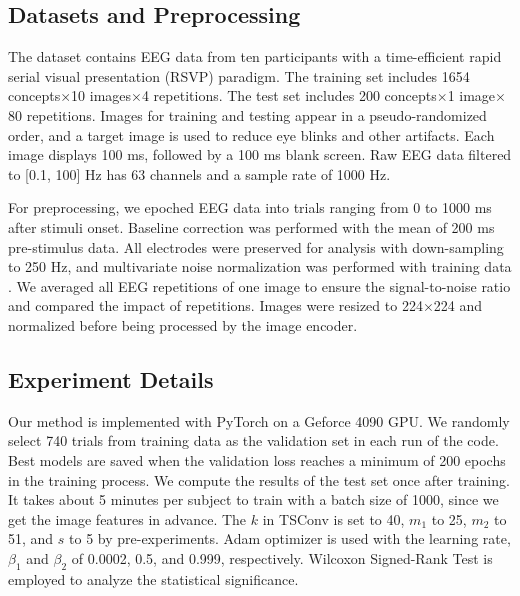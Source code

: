 \label{sec:results}
\subsection{Datasets and Preprocessing}
The dataset \citep{gifford2022large} contains EEG data from ten participants with a time-efficient rapid serial visual presentation (RSVP) paradigm.
The training set includes 1654 concepts\(\times\)10 images\(\times\)4 repetitions.
The test set includes 200 concepts\(\times\)1 image\(\times\)80 repetitions.
Images for training and testing appear in a pseudo-randomized order, and a target image is used to reduce eye blinks and other artifacts.
Each image displays 100 ms, followed by a 100 ms blank screen.
Raw EEG data filtered to [0.1, 100] Hz has 63 channels and a sample rate of 1000 Hz.

For preprocessing, we epoched EEG data into trials ranging from 0 to 1000 ms after stimuli onset.
Baseline correction was performed with the mean of 200 ms pre-stimulus data. 
All electrodes were preserved for analysis with down-sampling to 250 Hz, and multivariate noise normalization was performed with training data \citep{guggenmos2018multivariate}.
We averaged all EEG repetitions of one image to ensure the signal-to-noise ratio and compared the impact of repetitions.
Images were resized to 224\(\times\)224 and normalized before being processed by the image encoder.

\subsection{Experiment Details}
Our method is implemented with PyTorch on a Geforce 4090 GPU. 
We randomly select 740 trials from training data as the validation set in each run of the code. 
Best models are saved when the validation loss reaches a minimum of 200 epochs in the training process.
We compute the results of the test set once after training.
It takes about 5 minutes per subject to train with a batch size of 1000, since we get the image features in advance.
The \(k\) in TSConv is set to 40, \(m_1\) to 25, \(m_2\) to 51, and \(s\) to 5 by pre-experiments.
Adam optimizer is used with the learning rate, \(\beta_1\) and \(\beta_2\) of 0.0002,
0.5, and 0.999, respectively. 
Wilcoxon Signed-Rank Test is employed to analyze the statistical significance.

